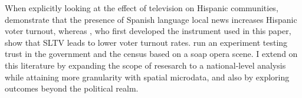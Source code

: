 \documentclass[11pt]{article}
\begin{document}
When explicitly looking at the effect of television on Hispanic communities, \cite{oberholzer-gee_media_2009} demonstrate that the presence of Spanish language local news increases Hispanic voter turnout, whereas  \cite{velez_tuning_2019}, who first developed the instrument used in this paper, show that SLTV leads to lower voter turnout rates. \cite{trujillo_devil_2012} run an experiment testing trust in the government and the census based on a soap opera scene. I extend on this literature by expanding the scope of resesarch to a national-level analysis while attaining more granularity with spatial microdata, and also by exploring outcomes beyond the political realm.



\end{document}

